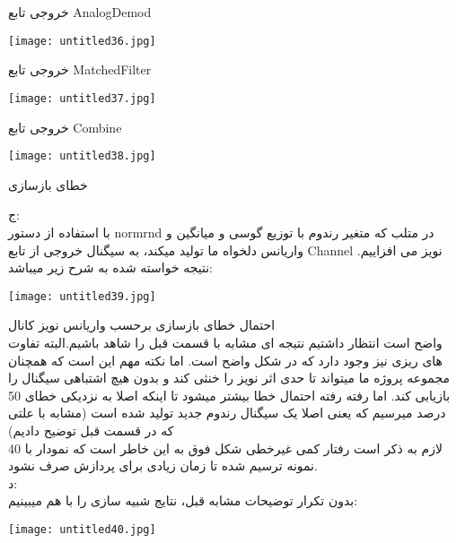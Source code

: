 \centering
خروجی تابع AnalogDemod
 

\begin{center}
    \texttt{[image: untitled36.jpg]}
\end{center}

\centering
خروجی تابع MatchedFilter
 

\begin{center}
    \texttt{[image: untitled37.jpg]}
\end{center}

\centering
خروجی تابع Combine
 

\begin{center}
    \texttt{[image: untitled38.jpg]}
\end{center}

\centering
خطای بازسازی


\raggedleft
ج:
\\
با استفاده از دستور normrnd در متلب که متغیر رندوم با توزیع گوسی و میانگین و واریانس دلخواه ما تولید میکند، به سیگنال خروجی از تابع Channel نویز می افزاییم. نتیجه خواسته شده به شرح زیر میباشد:


\begin{center}
    \texttt{[image: untitled39.jpg]}
\end{center}

\centering
احتمال خطای بازسازی برحسب واریانس نویز کانال
\\[0.5cm]
\raggedleft
\justify
واضح است انتظار داشتیم نتیجه ای مشابه با قسمت قبل را شاهد باشیم.البته تفاوت های ریزی نیز وجود دارد که در شکل واضح است. اما نکته مهم این است که همچنان مجموعه پروژه ما میتواند تا حدی اثر نویز را خنثی کند و بدون هیچ اشتباهی سیگنال را بازیابی کند. اما رفته رفته احتمال خطا بیشتر میشود تا اینکه اصلا به نزدیکی خطای 50 درصد میرسیم که یعنی اصلا یک سیگنال رندوم جدید تولید شده است (مشابه با علتی که در قسمت قبل توضیح دادیم)
\\
لازم به ذکر است رفتار کمی غیرخطی شکل فوق به این خاطر است که نمودار با 40 نمونه ترسیم شده تا زمان زیادی برای پردازش صرف نشود.
\\[1cm]



د:
\\
بدون تکرار توضیحات مشابه قبل، نتایج شبیه سازی را با هم میبینیم:

\begin{center}
    \texttt{[image: untitled40.jpg]}
\end{center}

